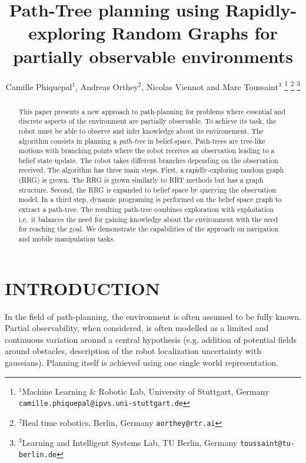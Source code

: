 \documentclass[letterpaper, 10 pt, conference]{ieeeconf}  %
\title{\LARGE \bf
Path-Tree planning using Rapidly-exploring Random Graphs for partially observable environments
}
\author{Camille Phiquepal$^{1}$, Andreas Orthey$^{2}$, Nicolas Viennot and Marc Toussaint$^{3}$
\thanks{$^{1}$Machine Learning \& Robotic Lab, University of Stuttgart, Germany
        {\tt\small camille.phiquepal@ipvs.uni-stuttgart.de}}
\thanks{$^{2}$Real time robotics, Berlin, Germany
        {\tt\small aorthey@rtr.ai}}
\thanks{$^{3}$Learning and Intelligent Systems Lab, TU Berlin, Germany
        {\tt\small toussaint@tu-berlin.de}}
}
\begin{document}
\maketitle
\thispagestyle{empty}
\pagestyle{empty}


\begin{abstract}
This paper presents a new approach to path-planning for problems where essential and discrete aspects of the environment are partially observable.
To achieve its task, the robot must be able to observe and infer knowledge about its environement.
The algorithm consists in planning a \textit{path-tree} in belief-space. Path-trees are tree-like motions with branching points where the robot receives an observation leading to a belief state update. The robot takes different branches depending on the observation received.
The algorithm has three main steps. First, a rapidly-exploring random graph (RRG) is grown. The RRG is grown similarly to RRT methods but has a graph structure. Second, the RRG is expanded to belief space by querying the observation model. In a third step, dynamic programing is performed on the belief space graph to extract a path-tree. The resulting path-tree combines exploration with exploitation i.e.\ it balances the need for gaining knowledge about the environment with the need for reaching the goal. We demonstrate the capabilities of the approach on navigation and mobile manipulation tasks.
\end{abstract}


\section{INTRODUCTION}
In the field of path-planning, the environment is often assumed to be fully known. Partial observability, when considered, is often modelled as a limited and continuous variation around a central hypothesis  (e.g. addition of potential fields around obstacles, description of the robot localization uncertainty with gaussians). Planning itself is achieved using one single world representation.
\end{document}
